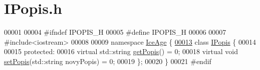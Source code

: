 \hypertarget{IPopis_8h_source}{}\section{I\+Popis.\+h}
\label{IPopis_8h_source}

\begin{DoxyCode}
00001 
00004 \textcolor{preprocessor}{#ifndef IPOPIS\_H}
00005 \textcolor{preprocessor}{#define IPOPIS\_H}
00006 
00007 \textcolor{preprocessor}{#include<iostream>}
00008 
00009 \textcolor{keyword}{namespace }\hyperlink{namespaceIceAge}{IceAge} \{
\hypertarget{IPopis_8h_source.tex_l00013}{}\hyperlink{classIceAge_1_1IPopis}{00013}     \textcolor{keyword}{class }\hyperlink{classIceAge_1_1IPopis}{IPopis} \{
00014 
00015     \textcolor{keyword}{protected}:
00016         \textcolor{keyword}{virtual} std::string \hyperlink{classIceAge_1_1IPopis_a512bd006e9bcb1fe60a2cac1c7eda62b}{getPopis}() = 0;
00018         \textcolor{keyword}{virtual} \textcolor{keywordtype}{void} \hyperlink{classIceAge_1_1IPopis_a26bc8c194c829f2d0d616cbd482504bf}{setPopis}(std::string novyPopis) = 0;
00019     \};
00020 \}
00021 \textcolor{preprocessor}{#endif}
\end{DoxyCode}
